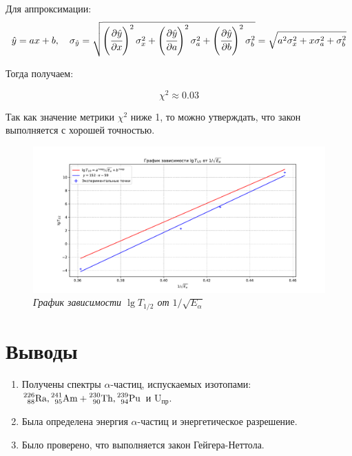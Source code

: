 \documentclass[a4paper,12pt]{article}
\begin{document}
Для аппроксимации:
\begin{equation*}
    \hat{y} = ax + b, \ \ \ \sigma_{\hat{y}} = \sqrt{ \left( \cfrac{\partial \hat{y}}{\partial x} \right)^2 \sigma_x^2 + \left( \cfrac{\partial \hat{y}}{\partial a} \right)^2 \sigma_a^2 + \left( \cfrac{\partial \hat{y}}{\partial b} \right)^2 \sigma_b^2 } = \sqrt{ a^2 \sigma_x^2 + x \sigma_a^2 + \sigma_b^2 }
\end{equation*}

Тогда получаем:

\begin{equation*}
    \chi^2 \approx 0.03
\end{equation*}

Так как значение метрики $\chi^2$ ниже 1, то можно утверждать, что закон выполняется с хорошей точностью.


\begin{figure}[!ht]
	\includegraphics[width=1.1\textwidth]{plots/graph_lgT.pdf}
	\caption{\textit{График зависимости $\lg{T_{1/2}}$ от $1 / \sqrt{E_\alpha}$}}
	\label{graph:lgT}
\end{figure}


\section{Выводы}

\begin{enumerate}
    \item Получены спектры $\alpha$-частиц, испускаемых изотопами: $\prescript{226}{88}{\text{Ra}}, \prescript{241}{95}{\text{Am}} + \prescript{230}{90}{\text{Th}}, \prescript{239}{94}{\text{Pu}}$ и $\text{U}_\text{пр}$.
    \item Была определена энергия $\alpha$-частиц и энергетическое разрешение.
    \item Было проверено, что выполняется закон Гейгера-Неттола.
\end{enumerate}
\end{document}
